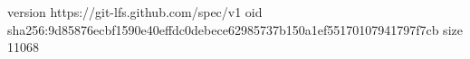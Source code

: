 version https://git-lfs.github.com/spec/v1
oid sha256:9d85876ecbf1590e40effdc0debece62985737b150a1ef55170107941797f7cb
size 11068
